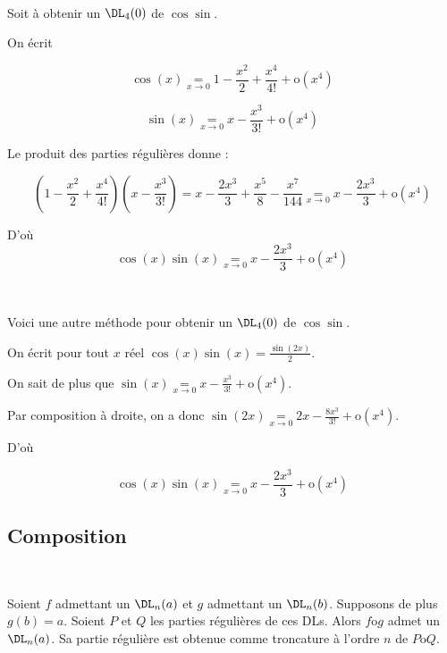 \documentclass[12pt]{article}
\begin{document}
\begin{Exem}~

Soit à obtenir un $\DL_4(0)$ de $\cos\sin$.

On écrit 

$$\cos(x)\underset{x\rightarrow 0}{=}1-\frac{x^2}{2}+\frac{x^4}{4!}+\text{o}(x^4)$$

$$\sin(x)\underset{x\rightarrow 0}{=}x-\frac{x^3}{3!}+\text{o}(x^4)$$

Le produit des parties régulières donne :

$$(1-\frac{x^2}{2}+\frac{x^4}{4!})(x-\frac{x^3}{3!}) = x - \frac{2x^3}{3}   + \frac{x^5}{8}  - \frac{ x^7}{144}
\underset{x\rightarrow 0}{=} x-\frac{2x^3}{3} + \text{o}(x^4)$$ 

D'où $$\cos(x)\sin(x)\underset{x\rightarrow 0}{=}x-\frac{2x^3}{3} + \text{o}(x^4)$$ 

\end{Exem}

\begin{Exem}~

Voici une autre méthode pour obtenir un $\DL_4(0)$ de $\cos\sin$.

On écrit pour tout $x$ réel $\cos(x)\sin(x)=\frac{\sin(2x)}{2}$.

On sait de plus que $\sin(x)\underset{x\rightarrow 0}{=}x-\frac{x^3}{3!}+\text{o}(x^4)$. 

Par composition à droite, on a donc $\sin(2x)\underset{x\rightarrow
  0}{=}2x-\frac{8 x^3}{3!}+\text{o}(x^4)$. 

D'où 

$$\cos(x)\sin(x)\underset{x\rightarrow
  0}{=}x-\frac{2 x^3}{3}+\text{o}(x^4)$$

\end{Exem}


\subsection{Composition}

\begin{Prop}~

\label{compoDL}

Soient $f$ admettant un $\DL_n(a)$  et $g$ admettant un
$\DL_n(b)$. Supposons de plus $g(b)=a$. Soient $P$ et $Q$ les parties
régulières de ces DLs. Alors $f\text{o} g$ admet un $\DL_n(a)$. Sa partie régulière
est obtenue comme troncature à l'ordre $n$ de $P \text{o} Q$.

\end{Prop}
\end{document}
